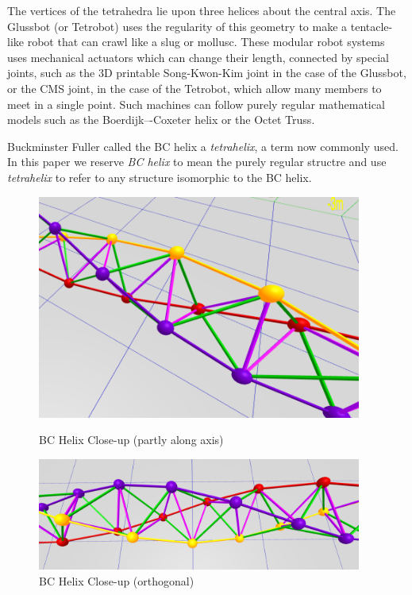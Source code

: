 \documentclass[review]{siamonline1116}
\begin{document}
The vertices of the tetrahedra lie upon
three helices about the central axis.
The \\
Glussbot\cite{readglussbot} (or Tetrobot)\cite{TetrobotBook} uses the regularity of
this geometry to make a tentacle-like robot that can crawl like a slug
or mollusc.  These modular robot systems uses mechanical actuators which can change their length, connected by special joints,
such as the 3D printable Song-Kwon-Kim\cite{song2003spherical} joint in the case of the Glussbot, or the CMS joint\cite{HamlinSandersonCMS}, in the case of the Tetrobot,
which allow many members to meet in a single point.
Such machines can
follow purely regular mathematical models such as the Boerdijk–-Coxeter
helix or the Octet Truss\cite{richard1961synergetic}.

Buckminster Fuller called the BC helix a \emph{tetrahelix}\cite{fuller1982synergetics},
a term now commonly used. In this paper we reserve \emph{BC helix} to mean the purely regular structre and use \emph{tetrahelix} to refer
to any structure isomorphic to the BC helix.



\begin{figure}[H]
  \centering
     \includegraphics[width=0.95\textwidth]{figures/BCHelixCloseUp.png}
     \caption{BC Helix Close-up (partly along axis)}
  \centering
     \includegraphics[width=0.95\textwidth]{figures/VerticalCloseUp.png}
     \caption{BC Helix Close-up (orthogonal)}
  \label{fig:closeup}
\end{figure}
\end{document}
